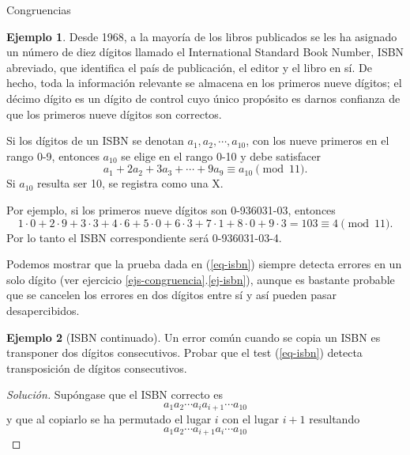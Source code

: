 \documentclass[11pt,spanish,makeidx]{amsbook}
\theoremstyle{definition}
\newtheorem{ejemplo}{Ejemplo}[section]
\theoremstyle{remark}
\begin{document}
\begin{section}{Congruencias}
\begin{ejemplo} Desde 1968, a la mayoría de los libros publicados se les ha asignado un número de diez dígitos llamado el International Standard Book Number, ISBN abreviado, que identifica el país de publicación, el editor y el libro en sí. De hecho, toda la información relevante se almacena en los primeros nueve dígitos; el décimo dígito es un dígito de control cuyo único propósito es darnos confianza de que los primeros nueve dígitos son correctos.
	
Si los dígitos de un ISBN se denotan $a_1, a_2,\cdots , a_{10}$, con los nueve primeros en el rango 0-9, entonces $a_{10}$ se elige en el rango 0-10 y debe satisfacer
\begin{equation}\label{eq-isbn}
	a_1 + 2a_2 + 3a_3 + \cdots + 9a_9  \equiv a_{10} \pmod{11}.
\end{equation}	
Si $a_{10}$ resulta ser 10, se registra como una X.  
	
Por ejemplo, si los primeros nueve dígitos son 0-936031-03, entonces
\begin{equation*}
	1 \cdot 0 + 2 \cdot 9 + 3 \cdot 3 + 4 \cdot 6 + 5 \cdot 0 + 6 \cdot 3 + 7 \cdot 1 + 8 \cdot 0 + 9 \cdot 3  =  103 \equiv 4 \pmod{11}.
\end{equation*}	
Por  lo tanto  el ISBN correspondiente será 0-936031-03-4.	

Podemos mostrar que la prueba dada en (\ref{eq-isbn}) siempre detecta errores en un solo dígito
(ver ejercicio \ref{ejs-congruencia}.\ref{ej-isbn}), aunque es bastante probable que se cancelen los errores en dos dígitos entre sí y así pueden pasar desapercibidos.

\end{ejemplo}

\begin{ejemplo}[ISBN continuado] Un error común cuando se copia un ISBN es transponer dos dígitos consecutivos. Probar que el test  (\ref{eq-isbn}) detecta transposición de dígitos consecutivos.
	\begin{proof}[Solución] 
	Supóngase que el ISBN correcto es 
	\begin{equation}\label{eq-isbn-coor}
		a_1 a_2\cdots a_{i}a_{i+1} \cdots a_{10}
	\end{equation}
	y que al copiarlo se ha permutado el lugar $i$ con el lugar $i+1$ resultando 
	\begin{equation}\label{eq-isbn-incoor}
		a_1 a_2\cdots a_{i+1}a_{i} \cdots a_{10}
	\end{equation}
	

\end{proof}
\end{ejemplo}
\end{section}
\end{document}
